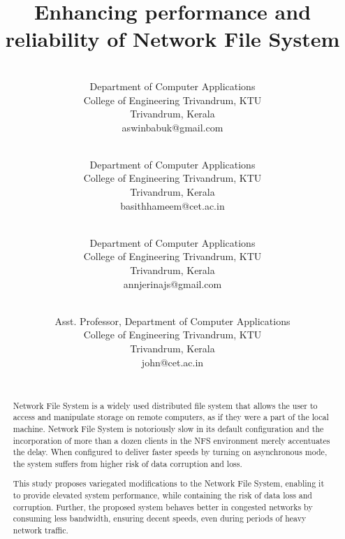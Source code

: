 \documentclass[conference]{IEEEtran}
\begin{document}
\title{Enhancing performance and reliability of Network File System\\
}

\author{
\\
Department of Computer Applications \\
College of Engineering Trivandrum, KTU\\
Trivandrum, Kerala \\
aswinbabuk@gmail.com\\
\and {}\\
Department of Computer Applications \\
College of Engineering Trivandrum, KTU\\
Trivandrum, Kerala \\
basithhameem@cet.ac.in\\
\and {}\\
Department of Computer Applications \\
College of Engineering Trivandrum, KTU\\
Trivandrum, Kerala  \\
annjerinajs@gmail.com\\
\and {}\\
Asst. Professor, Department of Computer Applications \\
College of Engineering Trivandrum, KTU\\
Trivandrum, Kerala \\
john@cet.ac.in\\
\\
}
\maketitle

\begin{abstract}
Network File System is a widely used distributed file system that allows the
user to access and manipulate storage on remote computers, as if they were a
part of the local machine. Network File System is notoriously slow in its 
default configuration and the incorporation of more than a dozen clients in the 
NFS environment merely accentuates the delay. When configured to deliver faster
speeds by turning on asynchronous mode, the system suffers from higher risk of 
data corruption and loss.

This study proposes variegated modifications to the Network File System,
enabling it to provide elevated system performance, while containing
the risk of data loss and corruption. Further, the proposed system behaves
better in congested networks by consuming less bandwidth, ensuring decent
speeds, even during periods of heavy network traffic.
\end{abstract}
\end{document}
